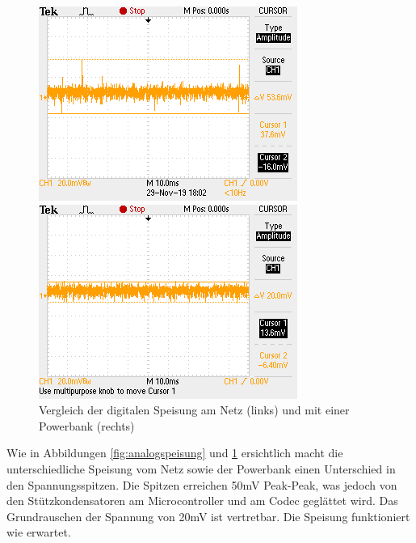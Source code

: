 \begin{figure} [H]
\begin{minipage}[c]{0.5\textwidth}
\includegraphics[width=\textwidth]{graphics/Speisung_Netz_Digital.png}
\end{minipage}
\begin{minipage}[c]{0.5\textwidth}
\includegraphics[width=\textwidth]{graphics/Speisung_PB_Digital.png}
\end{minipage}
\caption{Vergleich der digitalen Speisung am Netz (links) und mit einer Powerbank (rechts)}
\label{fig:digitalspeisung}
\end{figure} 

Wie in Abbildungen \ref{fig:analogspeisung} und \ref{fig:digitalspeisung} ersichtlich macht die unterschiedliche Speisung vom Netz sowie der Powerbank einen Unterschied in den Spannungsspitzen. Die Spitzen erreichen 50mV Peak-Peak, was jedoch von den Stützkondensatoren am Microcontroller und am Codec geglättet wird. Das Grundrauschen der Spannung von 20mV ist vertretbar. Die Speisung funktioniert wie erwartet.
